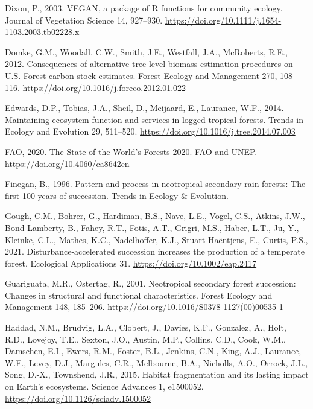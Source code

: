 \documentclass[
  12pt,
]{article}
\newlength{\cslhangindent}
\newlength{\cslentryspacingunit} %
\newenvironment{CSLReferences}[2] %
 {%
  \setlength{\parindent}{0pt}
  \ifodd #1
  \let\oldpar\par
  \def\par{\hangindent=\cslhangindent\oldpar}
  \fi
  \setlength{\parskip}{#2\cslentryspacingunit}
 }%
 {}
\begin{document}
\begin{CSLReferences}{1}{0}
\leavevmode{}%
Dixon, P., 2003. {VEGAN}, a package of {R} functions for community ecology. Journal of Vegetation Science 14, 927--930. \url{https://doi.org/10.1111/j.1654-1103.2003.tb02228.x}

\leavevmode{}%
Domke, G.M., Woodall, C.W., Smith, J.E., Westfall, J.A., McRoberts, R.E., 2012. Consequences of alternative tree-level biomass estimation procedures on {U}.{S}. Forest carbon stock estimates. Forest Ecology and Management 270, 108--116. \url{https://doi.org/10.1016/j.foreco.2012.01.022}

\leavevmode{}%
Edwards, D.P., Tobias, J.A., Sheil, D., Meijaard, E., Laurance, W.F., 2014. Maintaining ecosystem function and services in logged tropical forests. Trends in Ecology and Evolution 29, 511--520. \url{https://doi.org/10.1016/j.tree.2014.07.003}

\leavevmode{}%
FAO, 2020. The {State} of the {World}'s {Forests} 2020. {FAO and UNEP}. \url{https://doi.org/10.4060/ca8642en}

\leavevmode{}%
Finegan, B., 1996. Pattern and process in neotropical secondary rain forests: The first 100 years of succession. Trends in Ecology \& Evolution.

\leavevmode{}%
Gough, C.M., Bohrer, G., Hardiman, B.S., Nave, L.E., Vogel, C.S., Atkins, J.W., Bond-Lamberty, B., Fahey, R.T., Fotis, A.T., Grigri, M.S., Haber, L.T., Ju, Y., Kleinke, C.L., Mathes, K.C., Nadelhoffer, K.J., Stuart-Haëntjens, E., Curtis, P.S., 2021. Disturbance-accelerated succession increases the production of a temperate forest. Ecological Applications 31. \url{https://doi.org/10.1002/eap.2417}

\leavevmode{}%
Guariguata, M.R., Ostertag, R., 2001. Neotropical secondary forest succession: {Changes} in structural and functional characteristics. Forest Ecology and Management 148, 185--206. \url{https://doi.org/10.1016/S0378-1127(00)00535-1}

\leavevmode{}%
Haddad, N.M., Brudvig, L.A., Clobert, J., Davies, K.F., Gonzalez, A., Holt, R.D., Lovejoy, T.E., Sexton, J.O., Austin, M.P., Collins, C.D., Cook, W.M., Damschen, E.I., Ewers, R.M., Foster, B.L., Jenkins, C.N., King, A.J., Laurance, W.F., Levey, D.J., Margules, C.R., Melbourne, B.A., Nicholls, A.O., Orrock, J.L., Song, D.-X., Townshend, J.R., 2015. Habitat fragmentation and its lasting impact on {Earth}'s ecosystems. Science Advances 1, e1500052. \url{https://doi.org/10.1126/sciadv.1500052}


\end{CSLReferences}
\end{document}
